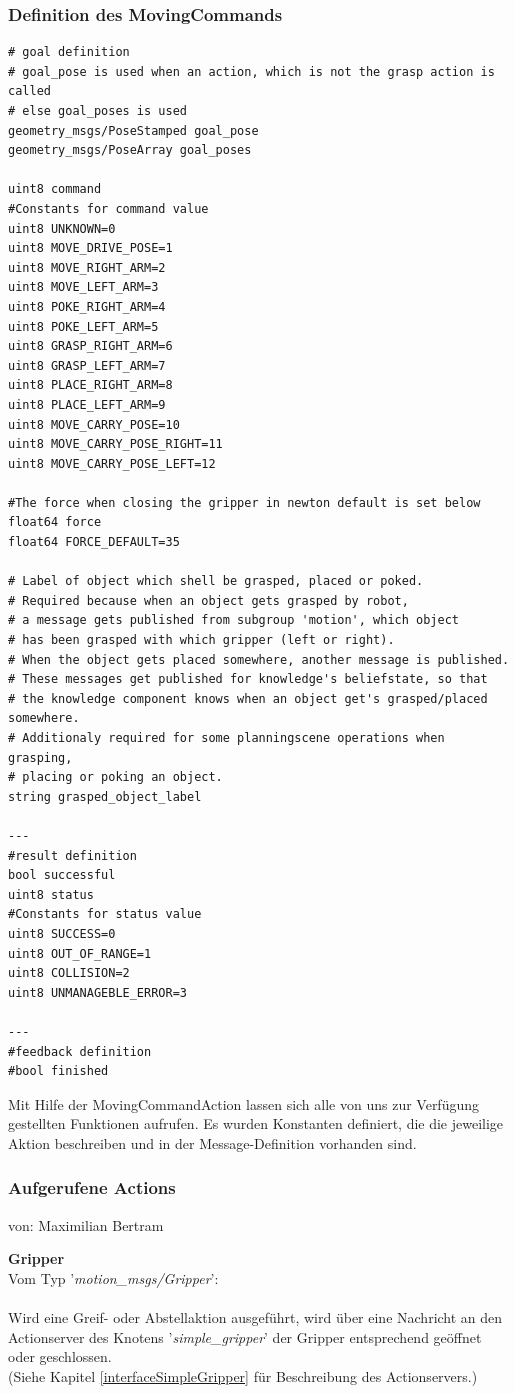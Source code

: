 \documentclass{suturo}
\makeatletter
\newcommand{\chapterauthor}[1]{%
  {\parindent0pt\vspace*{-27pt}%
  \linespread{0}\small\begin{flushright}von: #1\end{flushright}%
  \par\nobreak\vspace*{0pt}}
  \@afterheading%
}
\makeatother
\begin{document}
\subsubsection*{Definition des MovingCommands}
\begin{verbatim}
# goal definition
# goal_pose is used when an action, which is not the grasp action is called
# else goal_poses is used
geometry_msgs/PoseStamped goal_pose
geometry_msgs/PoseArray goal_poses

uint8 command
#Constants for command value
uint8 UNKNOWN=0
uint8 MOVE_DRIVE_POSE=1
uint8 MOVE_RIGHT_ARM=2
uint8 MOVE_LEFT_ARM=3
uint8 POKE_RIGHT_ARM=4
uint8 POKE_LEFT_ARM=5
uint8 GRASP_RIGHT_ARM=6
uint8 GRASP_LEFT_ARM=7
uint8 PLACE_RIGHT_ARM=8
uint8 PLACE_LEFT_ARM=9
uint8 MOVE_CARRY_POSE=10
uint8 MOVE_CARRY_POSE_RIGHT=11
uint8 MOVE_CARRY_POSE_LEFT=12

#The force when closing the gripper in newton default is set below
float64 force
float64 FORCE_DEFAULT=35

# Label of object which shell be grasped, placed or poked.
# Required because when an object gets grasped by robot,
# a message gets published from subgroup 'motion', which object
# has been grasped with which gripper (left or right).
# When the object gets placed somewhere, another message is published.
# These messages get published for knowledge's beliefstate, so that
# the knowledge component knows when an object get's grasped/placed somewhere.
# Additionaly required for some planningscene operations when grasping, 
# placing or poking an object.
string grasped_object_label

---
#result definition
bool successful
uint8 status
#Constants for status value
uint8 SUCCESS=0
uint8 OUT_OF_RANGE=1
uint8 COLLISION=2
uint8 UNMANAGEBLE_ERROR=3

---
#feedback definition
#bool finished
\end{verbatim}

Mit Hilfe der MovingCommandAction lassen sich alle von uns zur Verfügung gestellten Funktionen aufrufen. Es wurden Konstanten definiert, die die jeweilige Aktion beschreiben und in der Message-Definition vorhanden sind.

\subsubsection{Aufgerufene Actions}
\chapterauthor{Maximilian Bertram}
\textbf{Gripper}\\
Vom Typ '\textit{motion\_msgs/Gripper}': \\ \\
Wird eine Greif- oder Abstellaktion ausgeführt, wird über eine Nachricht an den Actionserver des Knotens '\textit{simple\_gripper}' der Gripper entsprechend geöffnet oder geschlossen.\\(Siehe Kapitel \ref{interfaceSimpleGripper} für Beschreibung des Actionservers.)\\
\end{document}
